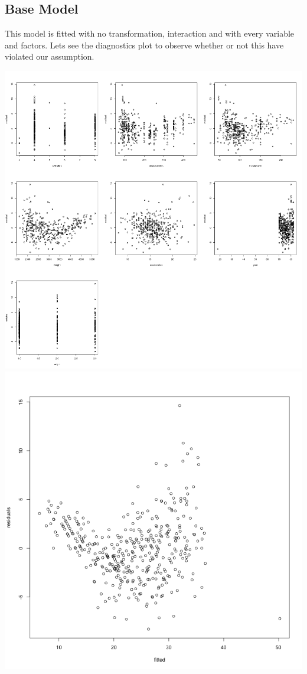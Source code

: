 \documentclass[11pt]{article} %
\begin{document}
\subsection{Base Model}
This model is fitted with no transformation, interaction and with every variable and factors. Lets see the diagnostics plot to observe whether or not this have violated our assumption.
\begin{center}
\includegraphics[scale=0.13]{1_res_vs_value}
\includegraphics[scale=0.2]{1_res_vs_fitted}
\end{center}
\end{document}
